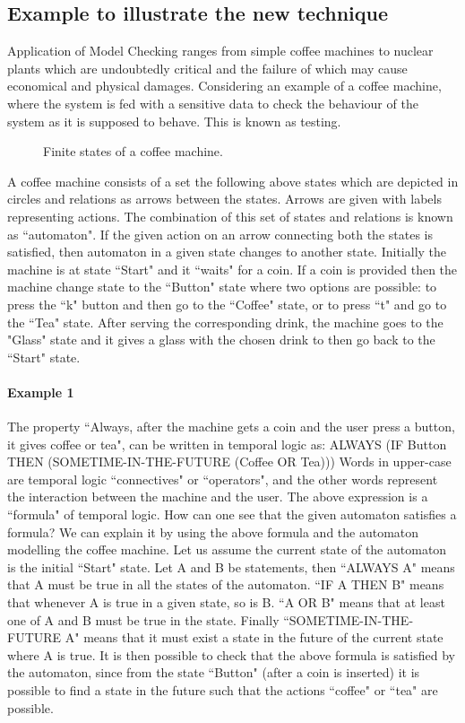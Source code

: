 \documentclass[a4paper,12pt]{extarticle}
\begin{document}
\subsection{Example to illustrate the new technique}
\label{Example}
Application of Model Checking ranges from simple coffee machines to nuclear plants which are undoubtedly critical and the failure of which may cause economical and physical damages. Considering an example of a coffee machine, where the system is fed with a sensitive data to check the behaviour of the system as it is supposed to behave. This is known as testing.
 \begin{figure}[h!]
 \centering
\caption{Finite states of a coffee machine.}
 \end{figure}
 A coffee machine consists of a set the following above states which are depicted in circles and relations as arrows between the states. Arrows are given with labels representing actions. The combination of this set of states and relations is known as ``automaton".  If the given action on an arrow connecting both the states is satisfied, then automaton in a given state changes to another state.
Initially the machine is at state ``Start" and it ``waits" for a coin. If a coin is provided then the machine change state to the ``Button" state where two options are possible: to press the ``k" button and then go to the ``Coffee" state, or to press ``t" and go to the ``Tea" state. After serving the corresponding drink, the machine goes to the "Glass" state and it gives a glass with the chosen drink to then go back to the ``Start" state.
\paragraph{Example 1}
The property ``Always, after the machine gets a coin and the user press a button, it gives coffee or tea", can be written in temporal logic as:
ALWAYS (IF Button THEN (SOMETIME-IN-THE-FUTURE (Coffee OR Tea)))
Words in upper-case are temporal logic ``connectives" or ``operators", and the other words represent the interaction between the machine and the user. The above expression is a ``formula" of temporal logic.
How can one see that the given automaton satisfies a formula? We can explain it by using the above formula and the automaton modelling the coffee machine.
Let us assume the current state of the automaton is the initial ``Start" state. Let A and B be statements, then ``ALWAYS A" means that A must be true in all the states of the automaton. ``IF A THEN B" means that whenever A is true in a given state, so is B. ``A OR B" means that at least one of A and B must be true in the state. Finally ``SOMETIME-IN-THE-FUTURE A" means that it must exist a state in the future of the current state where A is true.
It is then possible to check that the above formula is satisfied by the automaton, since from the state ``Button" (after a coin is inserted) it is possible to find a state in the future such that the actions ``coffee" or ``tea" are possible.
\end{document}
